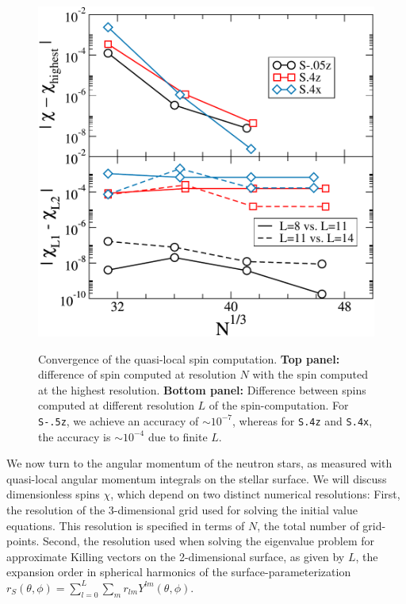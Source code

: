 {\begin{figure}
\includegraphics[width=0.95\columnwidth]{chap2/SpinConvergence}\\


\caption[Convergence of the quasi-local spin computation.]{\label{fig:SpinConvergence} Convergence of the quasi-local
  spin computation.  {\bf Top panel:} difference of spin computed at
  resolution $N$ with the spin computed at the highest resolution.
  {\bf Bottom panel:} Difference between spins computed at different
  resolution $L$ of the spin-computation.  For {\tt S-.5z}, we achieve an
  accuracy of $\sim 10^{-7}$, whereas for {\tt S.4z} and {\tt S.4x}, the accuracy
  is $\sim 10^{-4}$ due to finite $L$.}
\end{figure}

We now turn to the angular momentum of the neutron stars, as measured
with quasi-local angular momentum integrals on the stellar surface.
We will discuss dimensionless spins $\chi$, which depend on two
distinct numerical resolutions: First, the resolution of the
3-dimensional grid used for solving the initial value equations.  This
resolution is specified in terms of $N$, the total number of
grid-points.  Second, the resolution used when solving the eigenvalue
problem for approximate Killing vectors on the 2-dimensional surface,
as given by $L$, the expansion order in spherical harmonics of
  the surface-parameterization
  $r_S(\theta,\phi)=\sum_{l=0}^L\sum_m r_{lm}Y^{lm}(\theta,\phi)$.

}
